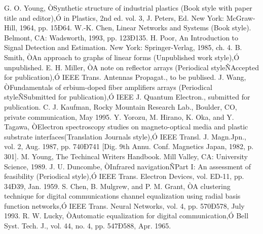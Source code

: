\documentclass[letterpaper, 11 pt, conference]{ieeeconf}  %
\begin{document}











\iffalse
\begin{thebibliography}{99}

 G. O. Young, ÒSynthetic structure of industrial plastics (Book style with paper title and editor),Ó 	in Plastics, 2nd ed. vol. 3, J. Peters, Ed.  New York: McGraw-Hill, 1964, pp. 15Ð64.
 W.-K. Chen, Linear Networks and Systems (Book style).	Belmont, CA: Wadsworth, 1993, pp. 123Ð135.
 H. Poor, An Introduction to Signal Detection and Estimation.   New York: Springer-Verlag, 1985, ch. 4.
 B. Smith, ÒAn approach to graphs of linear forms (Unpublished work style),Ó unpublished.
 E. H. Miller, ÒA note on reflector arrays (Periodical styleÑAccepted for publication),Ó IEEE Trans. Antennas Propagat., to be publised.
 J. Wang, ÒFundamentals of erbium-doped fiber amplifiers arrays (Periodical styleÑSubmitted for publication),Ó IEEE J. Quantum Electron., submitted for publication.
 C. J. Kaufman, Rocky Mountain Research Lab., Boulder, CO, private communication, May 1995.
 Y. Yorozu, M. Hirano, K. Oka, and Y. Tagawa, ÒElectron spectroscopy studies on magneto-optical media and plastic substrate interfaces(Translation Journals style),Ó IEEE Transl. J. Magn.Jpn., vol. 2, Aug. 1987, pp. 740Ð741 [Dig. 9th Annu. Conf. Magnetics Japan, 1982, p. 301].
 M. Young, The Techincal Writers Handbook.  Mill Valley, CA: University Science, 1989.
 J. U. Duncombe, ÒInfrared navigationÑPart I: An assessment of feasibility (Periodical style),Ó IEEE Trans. Electron Devices, vol. ED-11, pp. 34Ð39, Jan. 1959.
 S. Chen, B. Mulgrew, and P. M. Grant, ÒA clustering technique for digital communications channel equalization using radial basis function networks,Ó IEEE Trans. Neural Networks, vol. 4, pp. 570Ð578, July 1993.
 R. W. Lucky, ÒAutomatic equalization for digital communication,Ó Bell Syst. Tech. J., vol. 44, no. 4, pp. 547Ð588, Apr. 1965.

\end{thebibliography}
\end{document}
